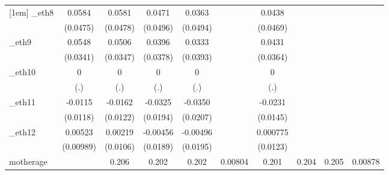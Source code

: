 \begin{table}[htbp]
\begin{tabular}{l*{9}{c}}
[1em]
\_eth8       &      0.0584         &      0.0581         &      0.0471         &      0.0363         &                     &      0.0438         &                     &                     &                     \\
            &    (0.0475)         &    (0.0478)         &    (0.0496)         &    (0.0494)         &                     &    (0.0469)         &                     &                     &                     \\
[1em]
\_eth9       &      0.0548         &      0.0506         &      0.0396         &      0.0333         &                     &      0.0431         &                     &                     &                     \\
            &    (0.0341)         &    (0.0347)         &    (0.0378)         &    (0.0393)         &                     &    (0.0364)         &                     &                     &                     \\
[1em]
\_eth10      &           0         &           0         &           0         &           0         &                     &           0         &                     &                     &                     \\
            &         (.)         &         (.)         &         (.)         &         (.)         &                     &         (.)         &                     &                     &                     \\
[1em]
\_eth11      &     -0.0115         &     -0.0162         &     -0.0325\sym{*}  &     -0.0350\sym{*}  &                     &     -0.0231         &                     &                     &                     \\
            &    (0.0118)         &    (0.0122)         &    (0.0194)         &    (0.0207)         &                     &    (0.0145)         &                     &                     &                     \\
[1em]
\_eth12      &     0.00523         &     0.00219         &    -0.00456         &    -0.00496         &                     &    0.000775         &                     &                     &                     \\
            &   (0.00989)         &    (0.0106)         &    (0.0189)         &    (0.0195)         &                     &    (0.0123)         &                     &                     &                     \\
[1em]
motherage   &                     &       0.206\sym{*}  &       0.202\sym{*}  &       0.202\sym{*}  &     0.00804         &       0.201\sym{*}  &       0.204\sym{*}  &       0.205\sym{*}  &     0.00878         \\

\end{tabular}
\end{table}
